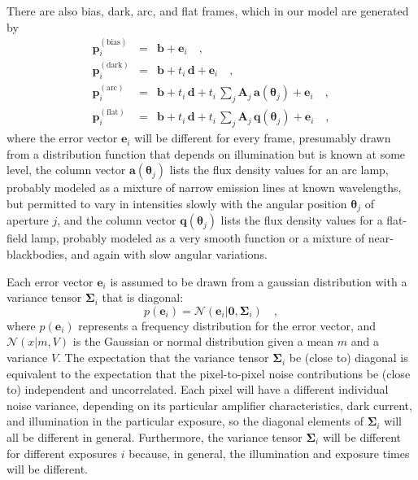 \documentclass[12pt]{article}
\newcommand{\hmatrix}[1]{\boldsymbol{#1}}
\newcommand{\Amatrix}{\hmatrix{A}}
\newcommand{\zero}{\hmatrix{0}}
\newcommand{\biaspixels}{\hmatrix{p}^\mathrm{(bias)}}
\newcommand{\darkpixels}{\hmatrix{p}^\mathrm{(dark)}}
\newcommand{\arcpixels}{\hmatrix{p}^\mathrm{(arc)}}
\newcommand{\flatpixels}{\hmatrix{p}^\mathrm{(flat)}}
\newcommand{\bias}{\hmatrix{b}}
\newcommand{\dark}{\hmatrix{d}}
\newcommand{\arc}{\hmatrix{a}}
\newcommand{\lamp}{\hmatrix{q}}
\renewcommand{\angle}{\hmatrix{\theta}}
\newcommand{\error}{\hmatrix{e}}
\newcommand{\pixelvariance}{\hmatrix{\Sigma}}
\newcommand{\Normal}{\mathscr{N}}
\newcommand{\exptime}{t}
\begin{document}
There are also bias, dark, arc, and flat frames, which in our model
are generated by
\begin{eqnarray}\displaystyle
\biaspixels_i & = & \bias 
                + \error_i \quad ,\\
\darkpixels_i & = & \bias + \exptime_i\,\dark
                + \error_i \quad ,\\
\arcpixels_i  & = & \bias + \exptime_i\,\dark
                + \exptime_i\,\sum_j \Amatrix_j\,\arc(\angle_j)
                + \error_i \quad ,\\
\flatpixels_i & = & \bias + \exptime_i\,\dark
                + \exptime_i\,\sum_j \Amatrix_j\,\lamp(\angle_j)
                + \error_i \quad ,
\end{eqnarray}
where the error vector $\error_i$ will be different for every frame,
presumably drawn from a distribution function that depends on
illumination but is known at some level, the column vector
$\arc(\angle_j)$ lists the flux density values for an arc lamp,
probably modeled as a mixture of narrow emission lines at known
wavelengths, but permitted to vary in intensities slowly with the
angular position $\angle_j$ of aperture $j$, and the column vector
$\lamp(\angle_j)$ lists the flux density values for a flat-field lamp,
probably modeled as a very smooth function or a mixture of
near-blackbodies, and again with slow angular variations.

Each error vector $\error_i$ is assumed to be drawn from a gaussian
distribution with a variance tensor $\pixelvariance_i$ that is
diagonal:
\begin{equation}
p(\error_i) =\Normal(\error_i|\zero,\pixelvariance_i) \quad,
\end{equation}
where $p(\error_i)$ represents a frequency distribution for the error
vector, and $\Normal(x|m,V)$ is the Gaussian or normal distribution
given a mean $m$ and a variance $V$.  The expectation that the
variance tensor $\pixelvariance_i$ be (close to) diagonal is
equivalent to the expectation that the pixel-to-pixel noise
contributions be (close to) independent and uncorrelated.  Each pixel
will have a different individual noise variance, depending on its
particular amplifier characteristics, dark current, and illumination
in the particular exposure, so the diagonal elements of
$\pixelvariance_i$ will all be different in general.  Furthermore, the
variance tensor $\pixelvariance_i$ will be different for different
exposures $i$ because, in general, the illumination and exposure times
will be different.
\end{document}
